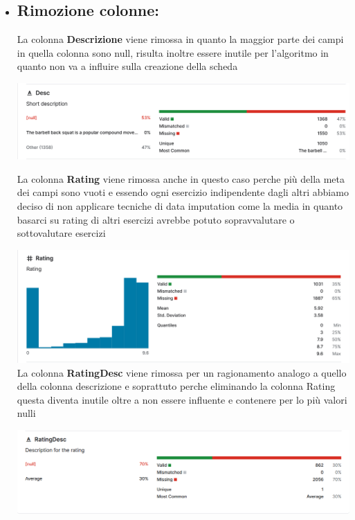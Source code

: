 \documentclass{book}
\begin{document}
\begin{itemize}
 \item \subsection{ Rimozione colonne:}\newline
  
  La colonna \textbf{Descrizione} viene rimossa in quanto la maggior parte dei campi in quella colonna sono null, risulta inoltre essere inutile per l'algoritmo in quanto non va a influire sulla creazione della scheda \newline
  
\includegraphics[width=1.0\linewidth]{info_descrizione.png}
\newpage

La colonna \textbf{Rating} viene rimossa anche in questo caso perche più della meta dei campi sono vuoti e essendo ogni esercizio indipendente dagli altri abbiamo deciso di non applicare tecniche di data imputation come la media in quanto basarci su rating di altri esercizi avrebbe potuto sopravvalutare o sottovalutare esercizi\newline

\includegraphics[width=1.0\linewidth]{info_rating.png}\newline
La colonna \textbf{RatingDesc} viene rimossa per un ragionamento analogo a quello della colonna descrizione e soprattuto perche eliminando la colonna Rating questa diventa inutile oltre a non essere influente e contenere per lo più valori nulli\newline

\includegraphics[width=1.0\linewidth]{info_ratingdesc.png}\newline


\end{itemize}
\end{document}
